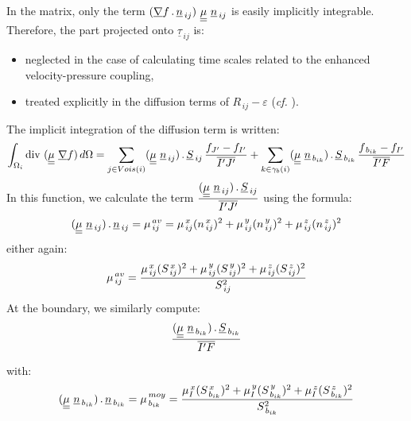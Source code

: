 In the matrix, only the term
$(\underline{\nabla} f \,.\,\underline{n}_{\,ij})\ \underline{\underline{\mu}}\ \underline{n}_{\,ij}$ is
easily implicitly integrable. Therefore, the part projected onto $\underline{\tau}_{\,ij}$
is:
\begin{itemize}
\item neglected in the case of calculating time scales related to the enhanced velocity-pressure coupling,
\item treated explicitly in the diffusion terms of
$R_{\,ij}-\varepsilon$ (\emph{cf.} ).\\
\end{itemize}
The implicit integration of the diffusion term is written:
\begin{equation}
\int_{\Omega_i}\dive\,(\tens{\mu}\ \grad f )\,d\Omega = \sum\limits_{j \in
Vois(i)}(\tens{\mu}\ \underline{n}_{\,ij})\,.\,\underline{S}_{\,ij}\,
\frac{f_{J'}-f_{I'}}{\overline{I'J'}} + \sum\limits_{k \in
\gamma_b(i)}(\tens{\mu}\ \underline{n}_{\,b_{ik}})\,.\,\underline{S}_{\,b_{ik}}
\,\frac{f_{\,b_{ik}}-f_{I'}}{\overline{I'F}}
\end{equation}
In this function, we calculate the term
$\displaystyle \frac{(\underline{\underline{\mu}}\
\underline{n}_{\,ij})\,.\,\underline{S}_{\,ij}}{\overline{I'J'}}$ using the
formula:
\begin{equation}\notag
(\underline{\underline{\mu}}\ \underline{n}_{\,ij})\,.\,\underline{n}_{\,ij} =
\mu_{\,ij}^{\,av}=\mu_{\,ij}^{\,x} ( n_{\,ij}^{\,x})^2 + \mu_{\,ij}^{\,y} (n_{\,ij}^{\,y})^2 + \mu_{\,ij}^{\,z}(n_{\,ij}^{\,z})^2
\end{equation}
either again:
\begin{equation}\notag
\mu_{\,ij}^{\,av}=\frac{\mu_{\,ij}^{\,x}
(S_{\,ij}^{\,x})^2 + \mu_{\,ij}^{\,y} (S_{\,ij}^{\,y})^2 +
\mu_{\,ij}^{\,z} (S_{\,ij}^{\,z})^2}{S_{\,ij}^2}
\end{equation}
At the boundary, we similarly compute:
\begin{equation}\notag
\displaystyle \frac{(\underline{\underline{\mu}}\
\underline{n}_{\,b_{ik}})\,.\,\underline{S}_{\,b_{ik}}}{\overline{I'F}}
\end{equation}

with:
\begin{equation}\notag
(\underline{\underline{\mu}}\ \underline{n}_{\,b_{ik}})\,.\,\underline{n}_{\,b_{ik}} =
\mu_{\,b_{ik}}^{\,moy} = \displaystyle \frac{\mu_{I}^{\,x}
(S_{\,b_{ik}}^{\,x})^2 + \mu_{I}^{\,y} (S_{\,b_{ik}}^{\,y})^2 +
\mu_{I}^{\,z} (S_{\,b_{ik}}^{\,z})^2}{S_{\,b_{ik}}^2}
\end{equation}

